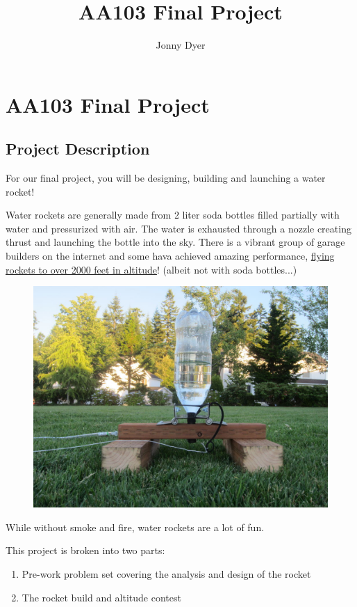 \documentclass[]{memoir} %
\title{AA103 Final Project}
\author{Jonny Dyer}
\begin{document}
\chapter*{AA103 Final Project}

\section{Project Description}
For our final project, you will be designing, building and launching a water rocket!

Water rockets are generally made from 2 liter soda bottles filled partially with water and
pressurized with air.  The water is exhausted through a nozzle creating thrust and
launching the bottle into the sky.  There is a vibrant group of garage builders on
the internet and some hava achieved amazing performance,
\href{http://www.wra2.org/WRA2_Standings.php}{flying rockets to over 2000
feet in altitude}! (albeit not with soda bottles...)  

\begin{figure}[H]
    \centering
    \includegraphics[width=0.95\columnwidth]{water_rocket}
\end{figure}

While without smoke and fire, water rockets are a lot of fun.  

This project is broken into two parts:

\begin{enumerate}
    \item Pre-work problem set covering the analysis and design of the rocket
    \item The rocket build and altitude contest
\end{enumerate}
\end{document}
